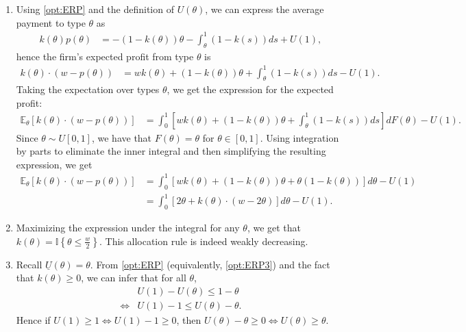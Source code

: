 \documentclass[a4paper]{article}
\begin{document}
\begin{enumerate}
	\item Using \eqref{opt:ERP} and the definition of $U(\theta)$, we can express the average payment to type $\theta$ as
	\begin{align}
		\label{opt:ERP1}
		k(\theta)p(\theta) &= -(1-k(\theta)) \theta - \int_{\theta}^{1} (1-k(s)) ds + U(1),
	\end{align}
	hence the firm's expected profit from type $\theta$ is
	\begin{align*}
		k(\theta)\cdot (w-p(\theta)) &= wk(\theta) + (1-k(\theta)) \theta + \int_{\theta}^{1} (1-k(s)) ds - U(1).
	\end{align*}
	Taking the expectation over types $\theta$, we get the expression for the expected profit:
	\begin{align*}
		\mathbb{E}_\theta [k(\theta)\cdot (w-p(\theta))] &= \int_0^1 \left[ wk(\theta) + (1-k(\theta)) \theta + \int_{\theta}^{1} (1-k(s)) ds \right] dF(\theta) - U(1).
	\end{align*}
	Since $\theta \sim U[0,1]$, we have that $F(\theta) = \theta$ for $\theta \in [0,1]$. Using integration by parts to eliminate the inner integral and then simplifying the resulting expression, we get
	\begin{align*}
		\mathbb{E}_\theta [k(\theta)\cdot (w-p(\theta))] &= \int_0^1 \left[ wk(\theta) + (1-k(\theta)) \theta + \theta (1-k(\theta)) \right] d\theta - U(1)
		\\
		&= \int_0^1 \left[ 2\theta + k(\theta) \cdot (w - 2\theta ) \right] d\theta - U(1).
	\end{align*}
	
	\item Maximizing the expression under the integral for any $\theta$, we get that $k(\theta) = \mathbb{I}\left\{ \theta \leq \frac{w}{2} \right\}$. This allocation rule is indeed weakly decreasing.
	
	\item Recall $\underline{U}(\theta)=\theta$. From \eqref{opt:ERP} (equivalently, \eqref{opt:ERP3}) and the fact that $k(\theta) \geq 0$, we can infer that for all $\theta$,
	\begin{align*}
		&U(1) - U(\theta) \leq 1-\theta
		\\
		\Leftrightarrow &U(1) - 1 \leq U(\theta) - \theta.
	\end{align*}
	Hence if $U(1)\geq 1 \iff U(1)-1 \geq 0$, then $U(\theta)-\theta \geq 0 \iff U(\theta) \geq \theta$.
	

\end{enumerate}
\end{document}
